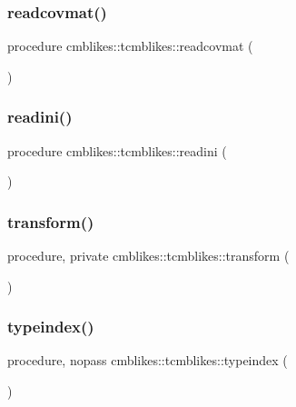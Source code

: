 \subsubsection{\texorpdfstring{readcovmat()}{readcovmat()}}
{\footnotesize\ttfamily procedure cmblikes\+::tcmblikes\+::readcovmat (\begin{DoxyParamCaption}{ }\end{DoxyParamCaption})\hspace{0.3cm}{\ttfamily [private]}}

\mbox{\label{structcmblikes_1_1tcmblikes_a51a87aafcf3bb5fcad7dec0889f693cf}} 
\subsubsection{\texorpdfstring{readini()}{readini()}}
{\footnotesize\ttfamily procedure cmblikes\+::tcmblikes\+::readini (\begin{DoxyParamCaption}{ }\end{DoxyParamCaption})\hspace{0.3cm}{\ttfamily [private]}}

\mbox{\label{structcmblikes_1_1tcmblikes_a42d2998562f20cc6a3c59e10a8e49bf3}} 
\subsubsection{\texorpdfstring{transform()}{transform()}}
{\footnotesize\ttfamily procedure, private cmblikes\+::tcmblikes\+::transform (\begin{DoxyParamCaption}{ }\end{DoxyParamCaption})\hspace{0.3cm}{\ttfamily [private]}}

\mbox{\label{structcmblikes_1_1tcmblikes_a497ee63bcf197dae6bc56e30c75625d1}} 
\subsubsection{\texorpdfstring{typeindex()}{typeindex()}}
{\footnotesize\ttfamily procedure, nopass cmblikes\+::tcmblikes\+::typeindex (\begin{DoxyParamCaption}{ }\end{DoxyParamCaption})\hspace{0.3cm}{\ttfamily [private]}}

